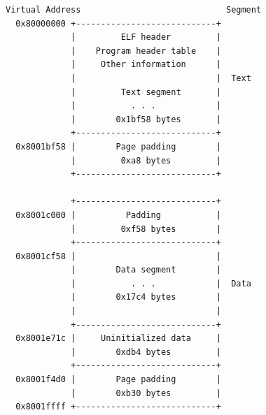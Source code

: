 \documentclass[USenglish,fontsize=11pt,twoside,%
  toc=bib,toc=idx,toc=graduated,numbers=noendperiod,
  bookmarks=true,
  bookmarksnumbered=true,
  bookmarksopen=true,
  bookmarksopenlevel=1,
  breaklinks=true,
  colorlinks=true,
  linkcolor=black,
  pdfpagelayout={TwoPageRight},
  pdfusetitle=true
]{scrreprt}
\newcommand{\stackit}[2][l]{\setlength{\tabcolsep}{0mm}\begin{tabular}{#1}%
    #2\end{tabular}}
\newif\ifSkipTikZ
\begin{document}
\begin{figure}
  \centering
  \ifSkipTikZ
\begin{verbatim}
Virtual Address                             Segment
  0x80000000 +----------------------------+
             |         ELF header         |
             |    Program header table    |
             |     Other information      |
             |                            |  Text
             |         Text segment       |
             |           . . .            |
             |        0x1bf58 bytes       |
             +----------------------------+
  0x8001bf58 |        Page padding        |
             |         0xa8 bytes         |
             +----------------------------+

             +----------------------------+
  0x8001c000 |          Padding           |
             |         0xf58 bytes        |
             +----------------------------+
  0x8001cf58 |                            |
             |        Data segment        |
             |           . . .            |  Data
             |        0x17c4 bytes        |
             |                            |
             +----------------------------+
  0x8001e71c |     Uninitialized data     |
             |        0xdb4 bytes         |
             +----------------------------+
  0x8001f4d0 |        Page padding        |
             |        0xb30 bytes         |
  0x8001ffff +----------------------------+
\end{verbatim}
  \else
\end{figure}
\end{document}
